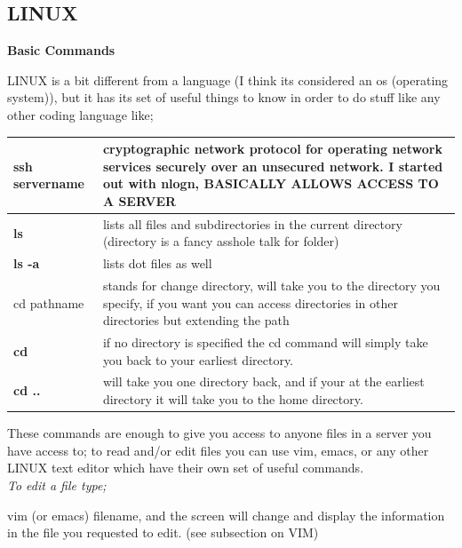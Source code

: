 \documentclass{article}
\begin{document}

\subsection{LINUX}

\textbf {Basic Commands}

LINUX is a bit different from a language (I think its considered an os (operating system)), but it has its set of useful things to know in order to do stuff like any other coding language like;

\begin{center}
\begin{tabular*}{\textwidth}{ | p{} | p{}| }
\hline
 \textbf{ssh servername} & cryptographic network protocol for operating network services securely over an unsecured network. I started out with nlogn, BASICALLY ALLOWS ACCESS TO A SERVER\\ 
\hline 
 \textbf{ls} & lists all files and subdirectories in the current directory (directory is a fancy asshole talk for folder) \\  
\hline 
\textbf{ls -a} & lists dot files as well \\   
cd pathname & stands for change directory, will take you to the directory you specify, if you want you can access directories in other directories but extending the path \\
\hline
\textbf{cd} & if no directory is specified the cd command will simply take you back to your earliest directory. \\ 
\hline 
\textbf{cd ..} & will take you one directory back, and if your at the earliest directory it will take you to the home directory. \\ 
\hline 
\end{tabular*}
\end{center}

These commands are enough to give you access to anyone files in a server you have access to; to read and/or edit files you can use vim, emacs, or any other LINUX text editor which have their own set of useful commands. \\

\textit{To edit a file type;} 

vim (or emacs) filename,
and the screen will change and display the information in the file you requested to edit. (see subsection on VIM) \\
\end{document}
